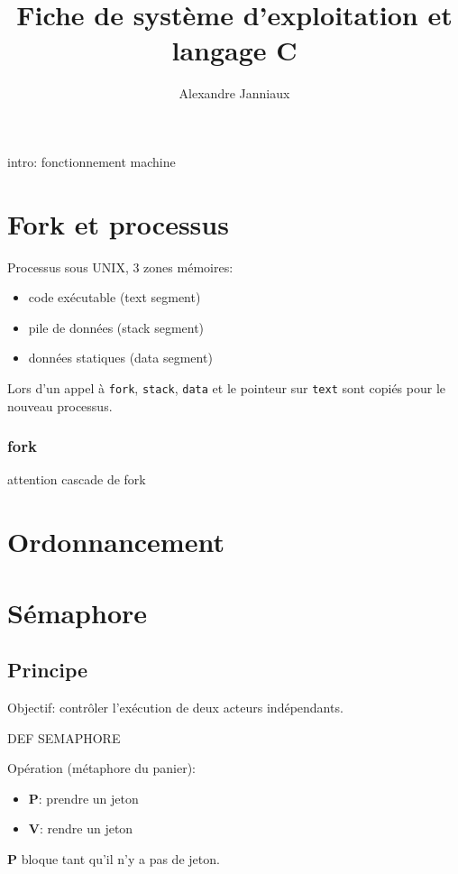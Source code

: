 \documentclass[10pt,twocolumn,a4paper]{article}
\title{Fiche de système d'exploitation et langage C}
\author{Alexandre Janniaux}
\begin{document}
\maketitle

intro: fonctionnement machine

\section{Fork et processus}

Processus sous {UNIX}, 3 zones mémoires:
\begin{itemize}
    \item code exécutable (text segment)
    \item pile de données (stack segment)
    \item données statiques (data segment)
\end{itemize}

Lors d'un appel à \texttt{fork}, \texttt{stack}, \texttt{data} et le pointeur sur \texttt{text} sont copiés pour le nouveau processus.

\subsubsection{fork}
attention cascade de fork

\section{Ordonnancement}



\section{Sémaphore}

\subsection{Principe}
Objectif: contrôler l'exécution de deux acteurs indépendants.

DEF SEMAPHORE

Opération (métaphore du panier): 
\begin{itemize} 
    \item \textbf{P}: prendre un jeton
    \item \textbf{V}: rendre un jeton
\end{itemize}

\textbf{P} bloque tant qu'il n'y a pas de jeton. 
\end{document}
